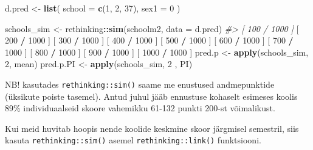 \documentclass[]{book}
\newenvironment{Shaded}{\begin{snugshade}}{\end{snugshade}}
\newcommand{\KeywordTok}[1]{\textcolor[rgb]{0.13,0.29,0.53}{\textbf{#1}}}
\newcommand{\DataTypeTok}[1]{\textcolor[rgb]{0.13,0.29,0.53}{#1}}
\newcommand{\DecValTok}[1]{\textcolor[rgb]{0.00,0.00,0.81}{#1}}
\newcommand{\StringTok}[1]{\textcolor[rgb]{0.31,0.60,0.02}{#1}}
\newcommand{\CommentTok}[1]{\textcolor[rgb]{0.56,0.35,0.01}{\textit{#1}}}
\newcommand{\OperatorTok}[1]{\textcolor[rgb]{0.81,0.36,0.00}{\textbf{#1}}}
\newcommand{\NormalTok}[1]{#1}
\begin{document}
\begin{Shaded}
\begin{Highlighting}[]
\NormalTok{d.pred <-}\StringTok{ }\KeywordTok{list}\NormalTok{(}
  \DataTypeTok{school =} \KeywordTok{c}\NormalTok{(}\DecValTok{1}\NormalTok{, }\DecValTok{2}\NormalTok{, }\DecValTok{37}\NormalTok{),}
  \DataTypeTok{sex1 =} \DecValTok{0}
\NormalTok{)}

\NormalTok{schools_sim <-}\StringTok{ }\NormalTok{rethinking}\OperatorTok{::}\KeywordTok{sim}\NormalTok{(schoolm2, }\DataTypeTok{data =}\NormalTok{ d.pred) }
\CommentTok{#> [ 100 / 1000 ]}
\NormalTok{[ }\DecValTok{200} \OperatorTok{/}\StringTok{ }\DecValTok{1000}\NormalTok{ ]}
\NormalTok{[ }\DecValTok{300} \OperatorTok{/}\StringTok{ }\DecValTok{1000}\NormalTok{ ]}
\NormalTok{[ }\DecValTok{400} \OperatorTok{/}\StringTok{ }\DecValTok{1000}\NormalTok{ ]}
\NormalTok{[ }\DecValTok{500} \OperatorTok{/}\StringTok{ }\DecValTok{1000}\NormalTok{ ]}
\NormalTok{[ }\DecValTok{600} \OperatorTok{/}\StringTok{ }\DecValTok{1000}\NormalTok{ ]}
\NormalTok{[ }\DecValTok{700} \OperatorTok{/}\StringTok{ }\DecValTok{1000}\NormalTok{ ]}
\NormalTok{[ }\DecValTok{800} \OperatorTok{/}\StringTok{ }\DecValTok{1000}\NormalTok{ ]}
\NormalTok{[ }\DecValTok{900} \OperatorTok{/}\StringTok{ }\DecValTok{1000}\NormalTok{ ]}
\NormalTok{[ }\DecValTok{1000} \OperatorTok{/}\StringTok{ }\DecValTok{1000}\NormalTok{ ]}
\NormalTok{pred.p <-}\StringTok{ }\KeywordTok{apply}\NormalTok{(schools_sim, }\DecValTok{2}\NormalTok{, mean)}
\NormalTok{pred.p.PI <-}\StringTok{ }\KeywordTok{apply}\NormalTok{(schools_sim, }\DecValTok{2}\NormalTok{ , PI)}
\end{Highlighting}
\end{Shaded}

NB! kasutades \texttt{rethinking::sim()} saame me enustused
andmepunktide (üksikute poiste tasemel). Antud juhul jääb ennustuse
kohaselt esimeses koolis 89\% individuaalseid skoore vahemikku 61-132
punkti 200-st võimalikust.

Kui meid huvitab hoopis nende koolide keskmine skoor järgmisel
semestril, siis kasuta \texttt{rethinking::sim()} asemel
\texttt{rethinking::link()} funktsiooni.
\end{document}
